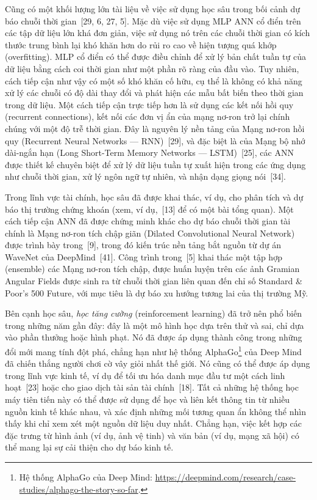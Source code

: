 Cũng có một khối lượng lớn tài liệu về việc sử dụng học sâu trong bối cảnh dự báo chuỗi thời gian~[29, 6, 27, 5]. Mặc dù việc sử dụng MLP ANN cổ điển trên các tập dữ liệu lớn khá đơn giản, việc sử dụng nó trên các chuỗi thời gian có kích thước trung bình lại khó khăn hơn do rủi ro cao về hiện tượng quá khớp (overfitting). MLP cổ điển có thể được điều chỉnh để xử lý bản chất tuần tự của dữ liệu bằng cách coi thời gian như một phần rõ ràng của đầu vào. Tuy nhiên, cách tiếp cận như vậy có một số khó khăn cố hữu, cụ thể là không có khả năng xử lý các chuỗi có độ dài thay đổi và phát hiện các mẫu bất biến theo thời gian trong dữ liệu. Một cách tiếp cận trực tiếp hơn là sử dụng các kết nối hồi quy (recurrent connections), kết nối các đơn vị ẩn của mạng nơ-ron trở lại chính chúng với một độ trễ thời gian. Đây là nguyên lý nền tảng của Mạng nơ-ron hồi quy (Recurrent Neural Networks — RNN)~[29], và đặc biệt là của Mạng bộ nhớ dài-ngắn hạn (Long Short-Term Memory Networks — LSTM)~[25], các ANN được thiết kế chuyên biệt để xử lý dữ liệu tuần tự xuất hiện trong các ứng dụng như chuỗi thời gian, xử lý ngôn ngữ tự nhiên, và nhận dạng giọng nói~[34].

Trong lĩnh vực tài chính, học sâu đã được khai thác, ví dụ, cho phân tích và dự báo thị trường chứng khoán (xem, ví dụ,~[13] để có một bài tổng quan). Một cách tiếp cận ANN đã được chứng minh khác cho dự báo chuỗi thời gian tài chính là Mạng nơ-ron tích chập giãn (Dilated Convolutional Neural Network) được trình bày trong~[9], trong đó kiến trúc nền tảng bắt nguồn từ dự án WaveNet của DeepMind~[41]. Công trình trong~[5] khai thác một tập hợp (ensemble) các Mạng nơ-ron tích chập, được huấn luyện trên các ảnh Gramian Angular Fields được sinh ra từ chuỗi thời gian liên quan đến chỉ số Standard \& Poor's 500 Future, với mục tiêu là dự báo xu hướng tương lai của thị trường Mỹ.

Bên cạnh học sâu, \emph{học tăng cường} (reinforcement learning) đã trở nên phổ biến trong những năm gần đây: đây là một mô hình học dựa trên thử và sai, chỉ dựa vào phần thưởng hoặc hình phạt. Nó đã được áp dụng thành công trong những đổi mới mang tính đột phá, chẳng hạn như hệ thống AlphaGo\footnote{Hệ thống AlphaGo của Deep Mind: \url{https://deepmind.com/research/case-studies/alphago-the-story-so-far}.} của Deep Mind đã chiến thắng người chơi cờ vây giỏi nhất thế giới. Nó cũng có thể được áp dụng trong lĩnh vực kinh tế, ví dụ để tối ưu hóa danh mục đầu tư một cách linh hoạt~[23] hoặc cho giao dịch tài sản tài chính~[18]. Tất cả những hệ thống học máy tiên tiến này có thể được sử dụng để học và liên kết thông tin từ nhiều nguồn kinh tế khác nhau, và xác định những mối tương quan ẩn không thể nhìn thấy khi chỉ xem xét một nguồn dữ liệu duy nhất. Chẳng hạn, việc kết hợp các đặc trưng từ hình ảnh (ví dụ, ảnh vệ tinh) và văn bản (ví dụ, mạng xã hội) có thể mang lại sự cải thiện cho dự báo kinh tế.

